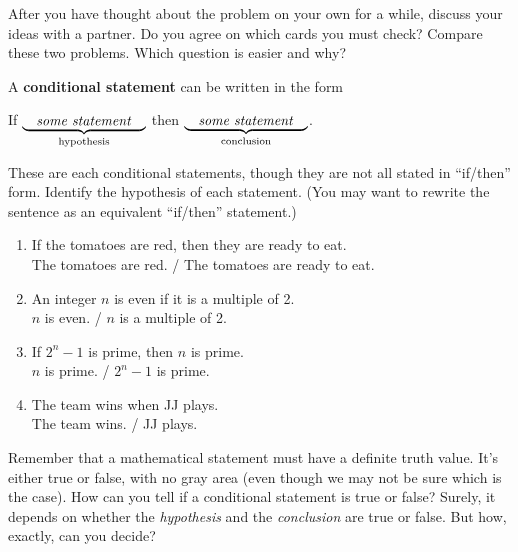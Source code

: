 \begin{thinkpair*}
After you have thought about the problem on your own for a while, discuss your ideas with a partner.  Do you agree on which cards you must check?   Compare these two problems.
Which question is easier and why?
\end{thinkpair*}

\begin{define}
A {\bf conditional statement} can be written in the form
\begin{center}
If $\underbrace{\quad \text{\emph{some statement}} \quad}_{\text{hypothesis}}$ then $\underbrace{\quad \text{\emph{some statement}}  \quad}_{\text{conclusion}}$.
\end{center}
\end{define}

\begin{thinkpair*}
 These are each conditional statements, though they are not all stated in ``if/then'' form.  Identify the hypothesis of each statement.  (You may want to rewrite the sentence as an equivalent ``if/then'' statement.)
 \vspace{.2in}

 \begin{enumerate}
\item 
If the tomatoes are red, then they are ready to eat.\\
The tomatoes are red. \qquad / \qquad The tomatoes are ready to eat.


\item
An integer $n$ is even if it is a multiple of 2.\\
$n$ is even. \qquad / \qquad $n$ is a multiple of 2.



\item
If $2^n - 1$ is prime, then $n$ is prime.\\
$n$ is prime. \qquad / \qquad $2^n-1$ is prime.



\item
The team wins when JJ plays.\\
The team wins. \qquad / \qquad JJ plays.


\end{enumerate}
\end{thinkpair*}

Remember that a mathematical statement must have a definite truth value.  It's either true or false, with no gray area (even though we may not be sure which is the case).  How can you tell if a conditional statement is true or false?  Surely, it depends on whether the \emph{hypothesis} and the \emph{conclusion} are true or false.  But how, exactly, can you decide?

